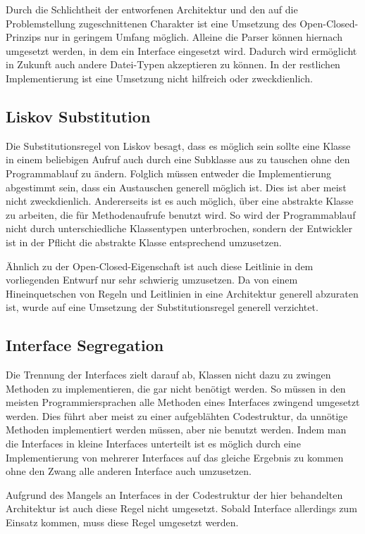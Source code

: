 {	Durch die Schlichtheit der entworfenen Architektur und den auf die Problemstellung zugeschnittenen Charakter ist eine Umsetzung des Open-Closed-Prinzips nur in geringem Umfang möglich. Alleine die Parser können hiernach umgesetzt werden, in dem ein Interface eingesetzt wird. Dadurch wird ermöglicht in Zukunft auch andere Datei-Typen akzeptieren zu können.
	In der restlichen Implementierung ist eine Umsetzung nicht hilfreich oder zweckdienlich.
	
	\subsection{Liskov Substitution}
	Die Substitutionsregel von Liskov besagt, dass es möglich sein sollte eine Klasse in einem beliebigen Aufruf auch durch eine Subklasse aus zu tauschen ohne den Programmablauf zu ändern.
	Folglich müssen entweder die Implementierung abgestimmt sein, dass ein Austauschen generell möglich ist. Dies ist aber meist nicht zweckdienlich.
	Andererseits ist es auch möglich, über eine abstrakte Klasse zu arbeiten, die für Methodenaufrufe benutzt wird. So wird der Programmablauf nicht durch unterschiedliche Klassentypen unterbrochen, sondern der Entwickler ist in der Pflicht die abstrakte Klasse entsprechend umzusetzen.
	
	Ähnlich zu der Open-Closed-Eigenschaft ist auch diese Leitlinie in dem vorliegenden Entwurf nur sehr schwierig umzusetzen. Da von einem Hineinquetschen von Regeln und Leitlinien in eine Architektur generell abzuraten ist, wurde auf eine Umsetzung der Substitutionsregel generell verzichtet.
	
	\subsection{Interface Segregation}
	Die Trennung der Interfaces zielt darauf ab, Klassen nicht dazu zu zwingen Methoden zu implementieren, die gar nicht benötigt werden. So müssen in den meisten Programmiersprachen alle Methoden eines Interfaces zwingend umgesetzt werden. Dies führt aber meist zu einer aufgeblähten Codestruktur, da unnötige Methoden implementiert werden müssen, aber nie benutzt werden.
	Indem man die Interfaces in kleine Interfaces unterteilt ist es möglich durch eine Implementierung von mehrerer Interfaces auf das gleiche Ergebnis zu kommen ohne den Zwang alle anderen Interface auch umzusetzen.
	
	Aufgrund des Mangels an Interfaces in der Codestruktur der hier behandelten Architektur ist auch diese Regel nicht umgesetzt. Sobald Interface allerdings zum Einsatz kommen, muss diese Regel umgesetzt werden.
	
}
